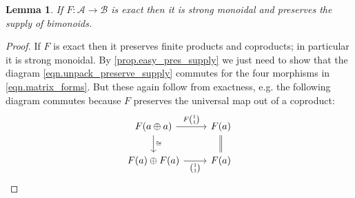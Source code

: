 \documentclass[11pt, oneside, article]{memoir}
\theoremstyle{plain}
\newtheorem{lemma}[theorem]{Lemma}
\theoremstyle{definition}
\theoremstyle{remark}
\newcommand{\cat}[1]{\mathcal{#1}}%
\begin{document}
\begin{lemma}\label{lemma.exact_pres_supply_bimonoid}
If $F\colon\cat{A}\to\cat{B}$ is exact then it is strong monoidal and preserves the supply of bimonoids.
\end{lemma}
\begin{proof}
If $F$ is exact then it preserves finite products and coproducts; in particular it is strong monoidal. By \cref{prop.easy_pres_supply} we just need to show that the diagram \cref{eqn.unpack_preserve_supply} commutes for the four morphisms in \cref{eqn.matrix_forms}. But these again follow from exactness, e.g. the following diagram commutes because $F$ preserves the universal map out of a coproduct:
\[
\begin{tikzcd}
	F(a\oplus a)\ar[r, "F{1\choose 1}"]\ar[d, "\cong"]&
	F(a)\ar[d, equal]\\
	F(a)\oplus F(a)\ar[r, "1\choose 1"']&
	F(a)
\end{tikzcd}
\qedhere
\]
\end{proof}
\end{document}
